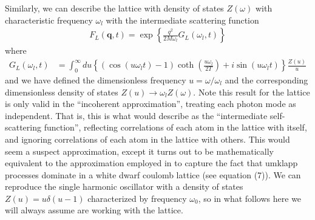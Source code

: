 \documentclass{article}
\begin{document}
Similarly, we can describe the lattice with density of states $Z(\omega)$ with characteristic frequency $\omega_l$ with the intermediate scattering function
\begin{align}
F_L(\textbf{q}, t) = \exp\left\{ \frac{q^2}{2 M \omega_l} G_L(\omega_l, t) \right\}
\end{align}
where
\begin{align}
G_L(\omega_l, t) &= \int_0^\infty du \left\{ (\cos(u\omega_l t) - 1) \coth\left( \frac{u \omega_l}{2 T} \right) + i \sin(u\omega_l t) \right\} \frac{Z(u)}{u}
\label{eq:LatticeScatteringFunctionExponent}
\end{align}
and we have defined the dimensionless frequency $u = \omega / \omega_l$ and the corresponding dimensionless density of states $Z(u)\to\omega_l Z(\omega)$. Note this result for the lattice is only valid in the ``incoherent approximation'', treating each photon mode as independent. That is, this is what \cite{interactions} would describe as the ``intermediate self-scattering function'', reflecting correlations of each atom in the lattice with itself, and ignoring correlations of each atom in the lattice with others. This would seem a suspect approximation, except it turns out to be mathematically equivalent to the approximation employed in \cite{dwarf} to capture the fact that umklapp processes dominate in a white dwarf coulomb lattice (see \cite{dwarf} equation (7)). We can reproduce the single harmonic oscillator with a density of states $Z(u) = u\delta(u - 1)$ characterized by frequency $\omega_0$, so in what follows here we will always assume are working with the lattice.
\end{document}
